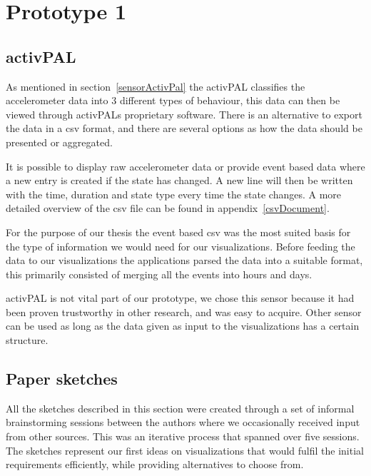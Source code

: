 \chapter{Prototype 1}

\section{activPAL}
As mentioned in section~\ref{sensorActivPal} the activPAL classifies the accelerometer data into 3 different types of behaviour, this data can then be viewed through activPALs proprietary software. There is an alternative to export the data in a \gls{csv} format, and there are several options as how the data should be presented or aggregated. 

It is possible to display raw accelerometer data or provide event based data where a new entry is created if the state has changed. A new line will then be written with the time, duration and state type every time the state changes. A more detailed overview of the \gls{csv} file can be found in appendix~\ref{csvDocument}.

For the purpose of our thesis the event based \gls{csv} was the most suited basis for the type of information we would need for our visualizations. Before feeding the data to our visualizations the applications parsed the data into a suitable format, this primarily consisted of merging all the events into hours and days. 

activPAL is not vital part of our prototype, we chose this sensor because it had been proven trustworthy in other research, and was easy to acquire. Other sensor can be used as long as the data given as input to the visualizations has a certain structure.

\section{Paper sketches}
All the sketches described in this section were created through a set of informal brainstorming sessions between the authors where we occasionally received input from other sources. This was an iterative process that spanned over five sessions. The sketches represent our first ideas on visualizations that would fulfil the initial requirements efficiently, while providing alternatives to choose from. 

